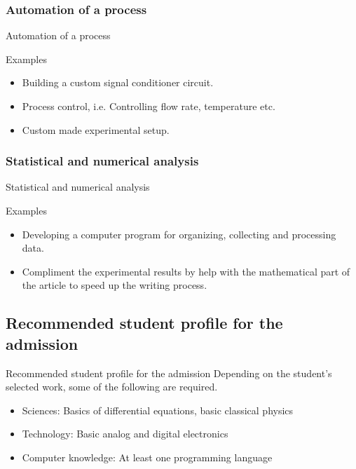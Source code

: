 \documentclass{beamer}
\begin{document}
\subsubsection{Automation of a process}
\begin{frame}{Automation of a process}
	\begin{block}{Examples}
		\begin{itemize}
			\item Building a custom signal conditioner circuit.
			\item Process control, i.e. Controlling flow rate, temperature etc.
			\item Custom made experimental setup.
		\end{itemize}
	\end{block}
	\framebreak
\end{frame}
\subsubsection{Statistical and numerical analysis}
\begin{frame}{Statistical and numerical analysis}
	\begin{block}{Examples}
		\begin{itemize}
			\item Developing a computer program for organizing, collecting and processing data.
			\item Compliment the experimental results by help with the mathematical part of the article to speed up the writing process.
		\end{itemize}
	\end{block}
	\framebreak
\end{frame}
\subsection{Recommended student profile for the admission}
\begin{frame}{Recommended student profile for the admission}
	Depending on the student's selected work, some of the following are required.
	\begin{itemize}
		\item Sciences: Basics of differential equations, basic classical physics
		\item Technology: Basic analog and digital electronics
		\item Computer knowledge: At least one programming language
	\end{itemize}
\end{frame}
\end{document}
